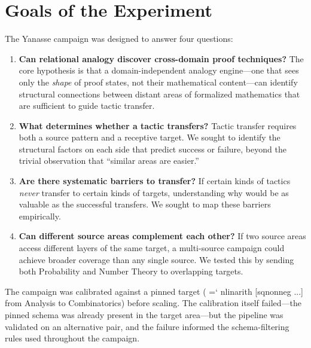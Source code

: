 \documentclass[11pt]{article}
\renewcommand{\texttt}[1]{%
  \begingroup\ttfamily\hyphenchar\font=`\-\relax
  \def\_{\textunderscore\discretionary{}{}{}}%
  #1\endgroup}
\theoremstyle{definition}
\theoremstyle{remark}
\begin{document}
\section{Goals of the Experiment}\label{sec:goals}

The Yanasse campaign was designed to answer four questions:

\begin{enumerate}
\item \textbf{Can relational analogy discover cross-domain proof
  techniques?}
  The core hypothesis is that a domain-independent analogy
  engine---one that sees only the \emph{shape} of proof states, not
  their mathematical content---can identify structural connections
  between distant areas of formalized mathematics that are
  sufficient to guide tactic transfer.

\item \textbf{What determines whether a tactic transfers?}
  Tactic transfer requires both a source pattern and a receptive
  target.  We sought to identify the structural factors on each side
  that predict success or failure, beyond the trivial observation
  that ``similar areas are easier.''

\item \textbf{Are there systematic barriers to transfer?}
  If certain kinds of tactics \emph{never} transfer to certain kinds
  of targets, understanding why would be as valuable as the
  successful transfers.  We sought to map these barriers empirically.

\item \textbf{Can different source areas complement each other?}
  If two source areas access different layers of the same target,
  a multi-source campaign could achieve broader coverage than any
  single source.  We tested this by sending both Probability and
  Number Theory to overlapping targets.
\end{enumerate}

The campaign was calibrated against a pinned target
(\texttt{nlinarith [sq\_nonneg ...]} from Analysis to Combinatorics)
before scaling.  The calibration itself failed---the pinned schema
was already present in the target area---but the pipeline was
validated on an alternative pair, and the failure informed the
schema-filtering rules used throughout the campaign.

\end{document}
